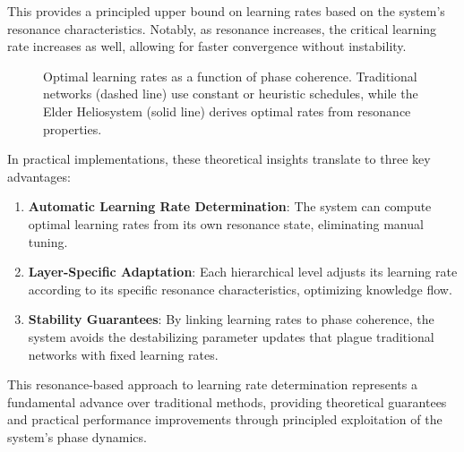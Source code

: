 This provides a principled upper bound on learning rates based on the system's resonance characteristics. Notably, as resonance increases, the critical learning rate increases as well, allowing for faster convergence without instability.

\begin{figure}[ht]
\centering
{}
\caption{Optimal learning rates as a function of phase coherence. Traditional networks (dashed line) use constant or heuristic schedules, while the Elder Heliosystem (solid line) derives optimal rates from resonance properties.}
\label{fig:optimal_lr}
\end{figure}

In practical implementations, these theoretical insights translate to three key advantages:

\begin{enumerate}
    \item \textbf{Automatic Learning Rate Determination}: The system can compute optimal learning rates from its own resonance state, eliminating manual tuning.
    
    \item \textbf{Layer-Specific Adaptation}: Each hierarchical level adjusts its learning rate according to its specific resonance characteristics, optimizing knowledge flow.
    
    \item \textbf{Stability Guarantees}: By linking learning rates to phase coherence, the system avoids the destabilizing parameter updates that plague traditional networks with fixed learning rates.
\end{enumerate}

This resonance-based approach to learning rate determination represents a fundamental advance over traditional methods, providing theoretical guarantees and practical performance improvements through principled exploitation of the system's phase dynamics.

